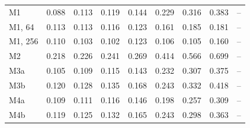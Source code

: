 \documentclass[preprint,12pt,authoryear]{elsarticle}
\begin{document}
\begin{table}[tbp]
\begin{tabular}{lcccccccc}
    M1 & 0.088 & 0.113 & 0.119 & 0.144 & 0.229 & 0.316 & 0.383 & -- \\
    M1, 64 & 0.113 & 0.113 & 0.116 & 0.123 & 0.161 & 0.185 & 0.181 & -- \\
    M1, 256 & 0.110 & 0.103 & 0.102 & 0.123 & 0.106 & 0.105 & 0.160 & -- \\
    M2 & 0.218 & 0.226 & 0.241 & 0.269 & 0.414 & 0.566 & 0.699 & -- \\
    M3a & 0.105 & 0.109 & 0.115 & 0.143 & 0.232 & 0.307 & 0.375 & -- \\
    M3b & 0.120 & 0.128 & 0.135 & 0.168 & 0.243 & 0.332 & 0.418 & -- \\
    M4a & 0.109 & 0.111 & 0.116 & 0.146 & 0.198 & 0.257 & 0.309 & -- \\
    M4b & 0.119 & 0.125 & 0.132 & 0.165 & 0.243 & 0.298 & 0.363 & -- \\
    \bottomrule
  \end{tabular}
\end{table}
\end{document}
